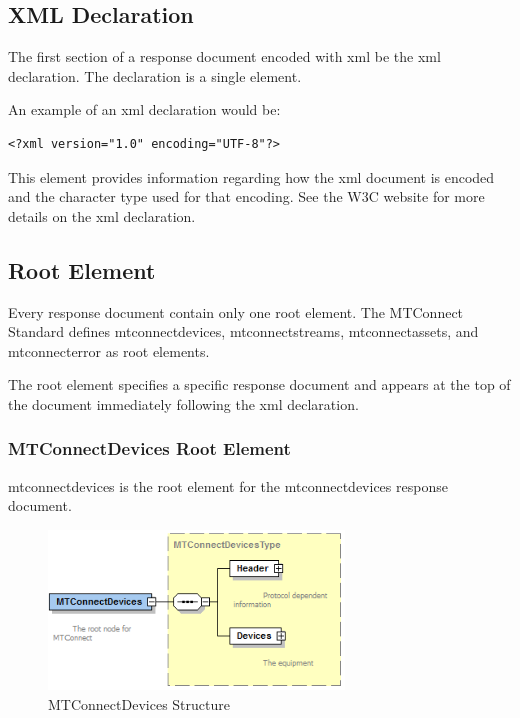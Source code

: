 \documentclass{mtconnect}	%
\begin{document}
\subsection{XML Declaration}

The first section of a \gls{response document} encoded with \gls{xml} \SHOULD be the \gls{xml declaration}.  The declaration is a single element.

An example of an \gls{xml declaration} would be:  

\begin{lstlisting}[firstnumber=1,escapechar=|,%
caption={Example of xml declaration}, label={lst:xml-declaration}]
<?xml version="1.0" encoding="UTF-8"?>
\end{lstlisting}

This element provides information regarding how the \gls{xml} document is encoded and the character type used for that encoding.  See the W3C website for more details on the \gls{xml} declaration. 

\subsection{Root Element}

Every \gls{response document} \MUST contain only one root element.  The MTConnect Standard defines \gls{mtconnectdevices}, \gls{mtconnectstreams}, \gls{mtconnectassets}, and \gls{mtconnecterror} as \glspl{root element}. 

The \gls{root element} specifies a specific \gls{response document} and appears at the top of the document immediately following the \gls{xml declaration}.

\subsubsection{MTConnectDevices Root Element}

\gls{mtconnectdevices} is the \gls{root element} for the \gls{mtconnectdevices response document}.  

\begin{figure}[ht]
  \centering
  \includegraphics[width=0.7\textwidth]{figures/mtconnectdevices-structure.png}
  \caption{MTConnectDevices Structure}
  \label{fig:mtconnectdevices-structure}
\end{figure}
\end{document}
